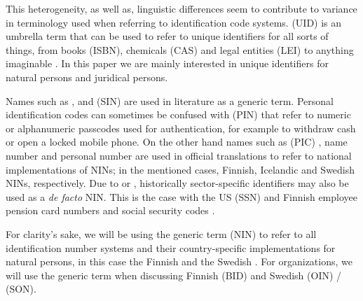 This heterogeneity, as well as, linguistic differences seem to contribute to variance in terminology used when referring to identification code systems.  (UID) is an umbrella term that can be used to refer to unique identifiers for all sorts of things, from books (ISBN), chemicals (CAS) and legal entities (LEI) to anything imaginable \citep[see][]{dodge2005}. In this paper we are mainly interested in unique identifiers for natural persons and juridical persons. 

Names such as  \citep{dodge2005},  \citep{alastalo2022} and  (SIN) \citep{otjacques2007} are used in literature as a generic term. Personal identification codes can sometimes be confused with  (PIN) that refer to numeric or alphanumeric passcodes used for authentication, for example to withdraw cash or open a locked mobile phone. On the other hand names such as  (PIC) \citep{hetudvv, sund2012}, name number \citep{watson2010} and personal number \citep{scb2016} are used in official translations to refer to national implementations of NINs; in the mentioned cases, Finnish, Icelandic and Swedish NINs, respectively. Due to  \citep[see][]{brensinger2021, alastalo2022} or  \citep[see][]{dodge2005}, historically sector-specific identifiers may also be used as a \emph{de facto} NIN. This is the case with the US  (SSN) \citep{brensinger2021} and Finnish employee pension card numbers and social security codes \citep{alastalo2022}.

For clarity's sake, we will be using the generic term  (NIN) to refer to all identification number systems and their country-specific implementations for natural persons, in this case the Finnish  and the Swedish . For organizations, we will use the generic term  when discussing Finnish  (BID) and Swedish  (OIN) /  (SON).

